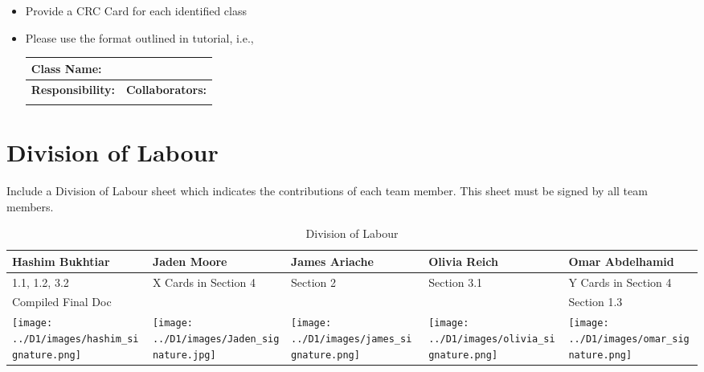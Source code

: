 \documentclass[]{article}
\begin{document}
\begin{itemize}
	\item Provide a CRC Card for each identified class
	\item Please use the format outlined in tutorial, i.e., 
	\begin{table}[ht]
		\centering
		\begin{tabular}{|p{5cm}|p{5cm}|}
		\hline 
		 \multicolumn{2}{|l|}{\textbf{Class Name:}} \\
		\hline
		\textbf{Responsibility:} & \textbf{Collaborators:} \\
		\hline
		\vspace{1in} & \\
		\hline
		\end{tabular}
	\end{table}
	
\end{itemize}

\appendix
\section{Division of Labour}
\label{sec:division_of_labour}
Include a Division of Labour sheet which indicates the contributions of each team member. This sheet must be signed by all team members.
\begin{table}[h!]
\centering
\begin{tabular}{|p{3cm}|p{3.5cm}|p{3cm}|p{3cm}|p{3.5cm}|}
\hline
Hashim Bukhtiar & Jaden Moore & James Ariache & Olivia Reich & Omar Abdelhamid \\ \hline
1.1, 1.2, 3.2 & X Cards in Section 4 & Section 2 & Section 3.1 & Y Cards in Section 4 \\ 
Compiled Final Doc &  &  &  & Section 1.3 \\
\texttt{[image: ../D1/images/hashim\_signature.png]} & \texttt{[image: ../D1/images/Jaden\_signature.jpg]} &
\texttt{[image: ../D1/images/james\_signature.png]}& \texttt{[image: ../D1/images/olivia\_signature.png]} & \texttt{[image: ../D1/images/omar\_signature.png]}  \\
\hline
\end{tabular}
\caption{Division of Labour} 
\label{tab:division_of_labour}
\end{table}
\end{document}

